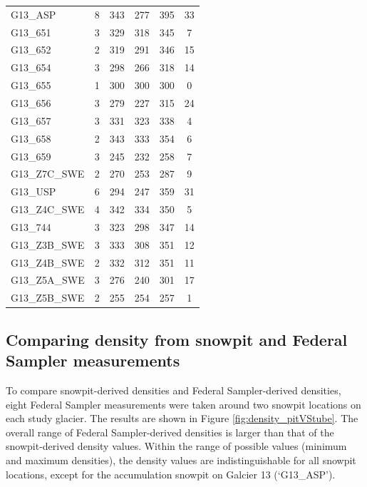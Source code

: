 \documentclass[12pt]{article}
\begin{document}
\begin{table}[]
\begin{tabular}{lccccc}
G13\_ASP & 8 & 343 & 277 & 395 & 33 \\
G13\_651 & 3 & 329 & 318 & 345 & 7 \\
G13\_652 & 2 & 319 & 291 & 346 & 15 \\
G13\_654 & 3 & 298 & 266 & 318 & 14 \\
G13\_655 & 1 & 300 & 300 & 300 & 0 \\
G13\_656 & 3 & 279 & 227 & 315 & 24 \\
G13\_657 & 3 & 331 & 323 & 338 & 4 \\
G13\_658 & 2 & 343 & 333 & 354 & 6 \\
G13\_659 & 3 & 245 & 232 & 258 & 7 \\
G13\_Z7C\_SWE & 2 & 270 & 253 & 287 & 9 \\
G13\_USP & 6 & 294 & 247 & 359 & 31 \\
G13\_Z4C\_SWE & 4 & 342 & 334 & 350 & 5 \\
G13\_744 & 3 & 323 & 298 & 347 & 14 \\
G13\_Z3B\_SWE & 3 & 333 & 308 & 351 & 12 \\
G13\_Z4B\_SWE & 2 & 332 & 312 & 351 & 11 \\
G13\_Z5A\_SWE & 3 & 276 & 240 & 301 & 17 \\
G13\_Z5B\_SWE & 2 & 255 & 254 & 257 & 1
\end{tabular}
\end{table}

\subsection{Comparing density from snowpit and Federal Sampler measurements}

To compare snowpit-derived densities and Federal Sampler-derived densities, eight Federal Sampler measurements were taken around two snowpit locations on each study glacier. The results are shown in Figure \ref{fig:density_pitVStube}. The overall range of Federal Sampler-derived densities is larger than that of the snowpit-derived density values. Within the range of possible values (minimum and maximum densities), the density values are indistinguishable for all snowpit locations, except for the accumulation snowpit on Galcier 13 (`G13\_ASP').
\end{document}
